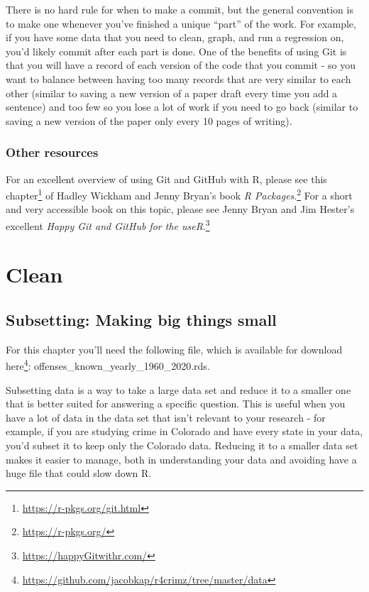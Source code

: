 \documentclass[
  a4paper,
]{krantz}
\renewcommand{\href}[2]{#2\footnote{\url{#1}}}
\begin{document}
There is no hard rule for when to make a commit, but the
general convention is to make one whenever you've finished a
unique ``part'' of the work. For example, if you have some
data that you need to clean, graph, and run a regression on,
you'd likely commit after each part is done. One of the
benefits of using Git is that you will have a record of each
version of the code that you commit - so you want to balance
between having too many records that are very similar to
each other (similar to saving a new version of a paper draft
every time you add a sentence) and too few so you lose a lot
of work if you need to go back (similar to saving a new
version of the paper only every 10 pages of writing).

\hypertarget{other-resources}{%
\section{Other resources}\label{other-resources}}

For an excellent overview of using Git and GitHub with R,
please see \href{https://r-pkgs.org/git.html}{this chapter}
of Hadley Wickham and Jenny Bryan's book
\href{https://r-pkgs.org/}{\emph{R Packages}.} For a short
and very accessible book on this topic, please see Jenny
Bryan and Jim Hester's excellent
\href{https://happyGitwithr.com/}{\emph{Happy Git and GitHub
for the useR}.}

\hypertarget{part-clean}{%
\part{Clean}\label{part-clean}}

\hypertarget{subsetting-intro}{%
\chapter{Subsetting: Making big things
small}\label{subsetting-intro}}

For this chapter you'll need the following file, which is
available for download
\href{https://github.com/jacobkap/r4crimz/tree/master/data}{here}:
offenses\_known\_yearly\_1960\_2020.rds.

Subsetting data is a way to take a large data set and reduce
it to a smaller one that is better suited for answering a
specific question. This is useful when you have a lot of
data in the data set that isn't relevant to your research -
for example, if you are studying crime in Colorado and have
every state in your data, you'd subset it to keep only the
Colorado data. Reducing it to a smaller data set makes it
easier to manage, both in understanding your data and
avoiding have a huge file that could slow down R.
\end{document}
